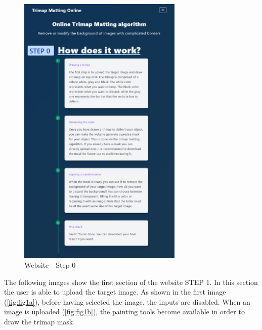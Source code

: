 \documentclass[a4paper]{article}
\begin{document}
\begin{figure}[ht]
    \centering
    \includegraphics[width=0.7\textwidth]{website/step0.png}
    \caption{Website - Step 0}
\end{figure}

\pagebreak

The following images show the first section
of the website \textsc{STEP 1}. In this section the user is able
to upload the target image.
As shown in the first image (\ref{fig:fig1a}),
before having selected the image,
the inputs are disabled.
When an image is uploaded (\ref{fig:fig1b}),
the painting tools become available
in order to draw the trimap mask.
\end{document}
